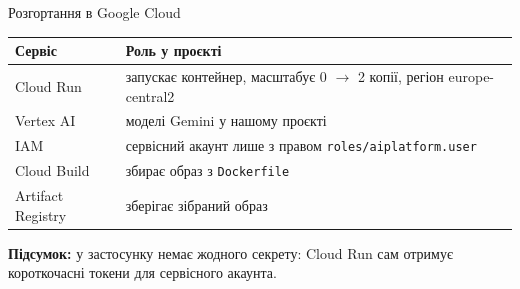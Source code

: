 \documentclass[aspectratio=169,11pt]{beamer}
\newcommand{\summary}[1]{\par\medskip\textbf{Підсумок:} #1}
\newcommand{\code}[1]{\texttt{#1}}
\begin{document}
\begin{frame}{Розгортання в Google Cloud}
  \centering

  \medskip
  \begin{tabular}{lL{0.62\textwidth}}
    \toprule
    \textbf{Сервіс} & \textbf{Роль у проєкті} \\
    \midrule
    Cloud Run & запускає контейнер, масштабує 0 $\to$ 2 копії, регіон europe-central2 \\
    Vertex AI & моделі Gemini у нашому проєкті \\
    IAM & сервісний акаунт лише з правом \code{roles/aiplatform.user} \\
    Cloud Build & збирає образ з \code{Dockerfile} \\
    Artifact Registry & зберігає зібраний образ \\
    \bottomrule
  \end{tabular}

  \raggedright
  \summary{у застосунку немає жодного секрету: Cloud Run сам отримує короткочасні токени
  для сервісного акаунта.}
\end{frame}
\end{document}
